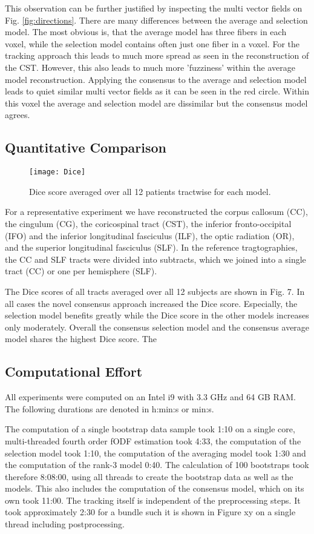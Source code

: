 This observation can be further justified by inspecting the multi vector fields
on Fig. \ref{fig:directions}. There are many differences between the average and
selection model. The most obvious is, that the average model has three fibers in
each voxel, while the selection model contains often just one fiber in a voxel.
For the tracking approach this leads to much more spread as seen in the
reconstruction of the CST. However, this also leads to much more 'fuzziness'
within the average model reconstruction. Applying the consensus to the average
and selection model leads to quiet similar multi vector fields as it can be seen
in the red circle. Within this voxel the average and selection model are
dissimilar but the consensus model agrees. 

\subsection{Quantitative Comparison}
\begin{figure}[h]
	\centering
	\texttt{[image: Dice]}
	\caption{Dice score averaged over all 12 patients tractwise for each
	model.}
	\label{fig:Dice}
\end{figure}
For a representative experiment we have reconstructed the corpus callosum (CC), the
cingulum (CG), the coricospinal tract (CST), the inferior fronto-occipital (IFO)
and the inferior longitudinal fasciculus (ILF), the optic radiation (OR), and
the superior longitudinal fasciculus (SLF). In the reference tragtographies, the
CC and SLF tracts were divided into subtracts, which we joined into a single
tract (CC) or one per hemisphere (SLF). 

The Dice scores of all tracts averaged over all 12 subjects are shown in Fig. 7.
In all cases the novel consensus approach increased the Dice score. Especially,
the selection model benefits greatly while the Dice score in the other models
increases only moderately. Overall the consensus selection model and the
consensus average model shares the highest Dice score. The 
\subsection{Computational Effort}
All experiments were computed on an Intel i9 with 3.3 GHz and 64 GB RAM. The
following durations are denoted in h:min:s or min:s.

The computation of a single bootstrap data sample took 1:10 on a single core,
multi-threaded fourth order fODF estimation took 4:33, the computation of the
selection model took 1:10, the computation of the averaging model took 1:30 and
the computation of the rank-3 model 0:40. The calculation of 100 bootstraps took
therefore 8:08:00, using all threads to create the bootstrap data as well as the
models. This also includes the computation of the consensus model, which on its
own took 11:00. The tracking itself is independent of the preprocessing steps.
It took approximately 2:30 for a bundle such it is shown in Figure xy on a
single thread including postprocessing.  


